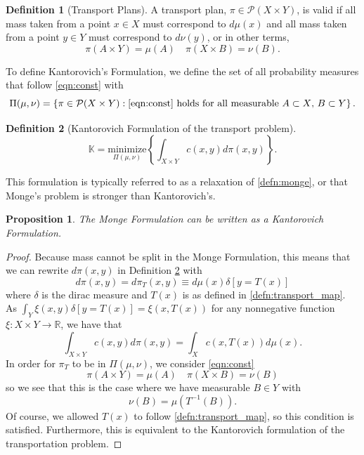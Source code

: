 \documentclass[psamsfonts]{amsart}
\newtheorem{prop}{Proposition}[section]
\theoremstyle{definition}
\newtheorem{defn}{Definition}[section]
\numberwithin{equation}{section}
\begin{document}
\begin{defn}[Transport Plans]
  A transport plan, $\pi \in \mathcal{P}(X\times Y)$, is valid if all mass taken from a point $x\in X$ must correspond to $d\mu(x)$ and all mass taken from a point $y\in Y$ must correspond to $d\nu(y)$, or in other terms,
  \begin{equation}\label{eqn:const}
    \pi(A\times Y) = \mu(A)\quad \pi(X\times B) = \nu(B).
  \end{equation}
\end{defn}
  
To define  Kantorovich's Formulation, we define the set of all probability measures that follow \autoref{eqn:const} with
\begin{equation}
  \Pi(\mu,\nu) = \left\{\pi\in \mathcal{P}(X\times Y): \text{\autoref{eqn:const} holds for all measurable $A\subset X$, $B\subset Y$}\right\}.
\end{equation}
\begin{defn}[Kantorovich Formulation of the transport problem]\label{defn:kantorovich}
  \begin{equation}
    \mathbb{K} = \underset{\Pi(\mu,\nu)}{\text{minimize}}\left\{\int_{X\times Y} c(x,y)d\pi(x,y)\right\}.
  \end{equation}
\end{defn}
This formulation is typically referred to as a relaxation of \autoref{defn:monge}, or that Monge's problem is stronger than Kantorovich's.
\begin{prop}\label{prop:equiv}
  The Monge Formulation can be written as a Kantorovich Formulation.
\end{prop}
\begin{proof}
  Because mass cannot be split in the Monge Formulation, this means that we can rewrite $d\pi(x,y)$ in Definition \ref{defn:kantorovich}
  with
  \[ d\pi(x,y)=d\pi_T(x,y) \equiv d\mu(x)\delta[y=T(x)]\]
  where $\delta$ is the dirac measure and $T(x)$ is as defined in \autoref{defn:transport_map}. As $\int_Y\xi(x,y)\delta[y=T(x)] = \xi(x,T(x))$ for any nonnegative function $\xi:X\times Y\to \mathbb{R}$, we have that 
  \[ \int_{X\times Y}c(x,y)d\pi(x,y) = \int_X c(x,T(x))d\mu(x).\]
  In order for $\pi_T$ to be in $\Pi(\mu,\nu)$, we consider \autoref{eqn:const}
  \[\pi(A\times Y) = \mu(A)\quad \pi(X \times B) = \nu(B)\]
  so we see that this is the case where we have measurable $B\in Y$ with 
  \[\nu(B) = \mu(T^{-1}(B)).\]
  Of course, we allowed $T(x)$ to follow \autoref{defn:transport_map}, so this condition is satisfied. Furthermore, this is equivalent to the Kantorovich formulation of the transportation problem.
\end{proof}
\end{document}

